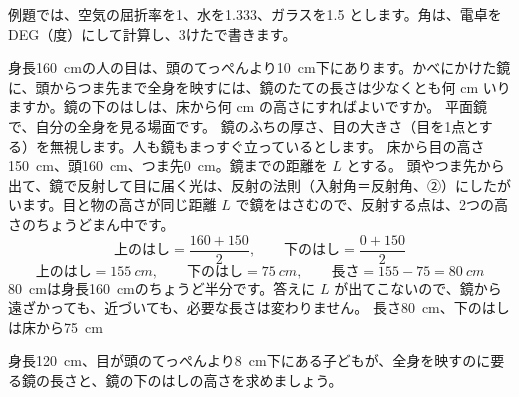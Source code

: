 \begin{kotoba}
\small
{}
\end{kotoba}

{}

\noindent 例題では、空気の屈折率を1、水を1.333、ガラスを1.5 とします。角は、電卓を DEG（度）にして計算し、3けたで書きます。

\label{ph:波-12:ex1}
\begin{phreidai}[全身を映す鏡]
身長\qty{160}{cm}の人の目は、頭のてっぺんより\qty{10}{cm}下にあります。かべにかけた鏡に、頭からつま先まで全身を映すには、鏡のたての長さは少なくとも何 cm いりますか。鏡の下のはしは、床から何 cm の高さにすればよいですか。
\phbamen
平面鏡で、自分の全身を見る場面です。
\phmushi
鏡のふちの厚さ、目の大きさ（目を1点とする）を無視します。人も鏡もまっすぐ立っているとします。
\phzu
床から目の高さ\qty{150}{cm}、頭\qty{160}{cm}、つま先\qty{0}{cm}。鏡までの距離を $L$ とする。
\phriyu
頭やつま先から出て、鏡で反射して目に届く光は、反射の法則（入射角＝反射角、②）にしたがいます。目と物の高さが同じ距離 $L$ で鏡をはさむので、反射する点は、2つの高さのちょうどまん中です。
\phtateru
\[\text{上のはし}=\frac{160+150}{2},\qquad\text{下のはし}=\frac{0+150}{2}\]
\phtoku
\[\text{上のはし}=\qty{155}{cm},\qquad\text{下のはし}=\qty{75}{cm},\qquad\text{長さ}=155-75=\qty{80}{cm}\]
\phtashikame
\qty{80}{cm}は身長\qty{160}{cm}のちょうど半分です。答えに $L$ が出てこないので、鏡から遠ざかっても、近づいても、必要な長さは変わりません。
\kotae 長さ\qty{80}{cm}、下のはしは床から\qty{75}{cm}
\end{phreidai}
\begin{jibun}
身長\qty{120}{cm}、目が頭のてっぺんより\qty{8}{cm}下にある子どもが、全身を映すのに要る鏡の長さと、鏡の下のはしの高さを求めましょう。
\end{jibun}

